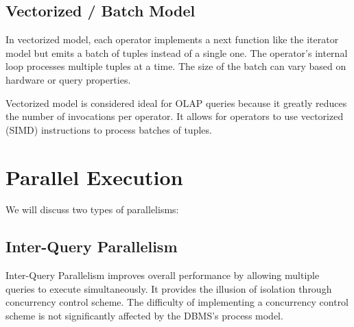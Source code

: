 \documentclass[11pt]{article}
\begin{document}
\subsection*{Vectorized / Batch Model}
In vectorized model, each operator implements a next function like the iterator model but emits a 
batch of tuples instead of a single one. The operator's internal loop processes multiple tuples at a 
time. The size of the batch can vary based on hardware or query properties.

Vectorized model is considered ideal for OLAP queries because it greatly reduces the number of 
invocations per operator. It allows for operators to use vectorized (SIMD) instructions to process 
batches of tuples.


\section{Parallel Execution}
We will discuss two types of parallelisms:
\subsection*{Inter-Query Parallelism}
Inter-Query Parallelism improves overall performance by allowing multiple queries to execute 
simultaneously. It provides the illusion of isolation through concurrency control scheme. The 
difficulty of implementing a concurrency control scheme is not significantly affected by the DBMS’s 
process model.

\end{document}
